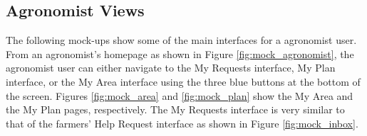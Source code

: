 \newpage
\subsection{Agronomist Views}
\begin{flushleft}
The following mock-ups show some of the main interfaces for a agronomist user. From an agronomist's homepage as shown in Figure \ref{fig:mock_agronomist}, the agronomist user can either navigate to the My Requests interface, My Plan interface, or the My Area interface using the three blue buttons at the bottom of the screen. Figures \ref{fig:mock_area} and \ref{fig:mock_plan} show the My Area and the My Plan pages, respectively. The My Requests interface is very similar to that of the farmers' Help Request interface as shown in Figure \ref{fig:mock_inbox}.
\end{flushleft}


